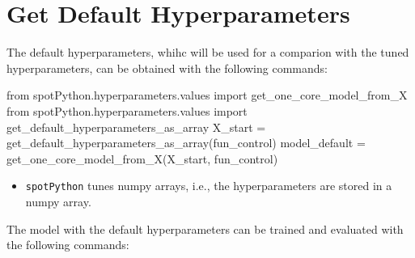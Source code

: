 \documentclass[
  letterpaper,
  DIV=11,
  numbers=noendperiod]{scrreprt}
\newenvironment{Shaded}{\begin{snugshade}}{\end{snugshade}}
\newcommand{\ImportTok}[1]{\textcolor[rgb]{0.00,0.46,0.62}{#1}}
\newcommand{\NormalTok}[1]{\textcolor[rgb]{0.00,0.23,0.31}{#1}}
\newcommand{\OperatorTok}[1]{\textcolor[rgb]{0.37,0.37,0.37}{#1}}
\providecommand{\tightlist}{%
  \setlength{\itemsep}{0pt}\setlength{\parskip}{0pt}}\usepackage{longtable,booktabs,array}
\begin{document}
\section{Get Default
Hyperparameters}\label{get-default-hyperparameters-1}

The default hyperparameters, whihc will be used for a comparion with the
tuned hyperparameters, can be obtained with the following commands:

\begin{Shaded}
\begin{Highlighting}[]
\ImportTok{from}\NormalTok{ spotPython.hyperparameters.values }\ImportTok{import}\NormalTok{ get\_one\_core\_model\_from\_X}
\ImportTok{from}\NormalTok{ spotPython.hyperparameters.values }\ImportTok{import}\NormalTok{ get\_default\_hyperparameters\_as\_array}
\NormalTok{X\_start }\OperatorTok{=}\NormalTok{ get\_default\_hyperparameters\_as\_array(fun\_control)}
\NormalTok{model\_default }\OperatorTok{=}\NormalTok{ get\_one\_core\_model\_from\_X(X\_start, fun\_control)}
\end{Highlighting}
\end{Shaded}

\begin{tcolorbox}[enhanced jigsaw, coltitle=black, bottomrule=.15mm, breakable, toprule=.15mm, colframe=quarto-callout-note-color-frame, title=\textcolor{quarto-callout-note-color}{\faInfo}\hspace{0.5em}{Note: \texttt{spotPython} tunes numpy arrays}, colbacktitle=quarto-callout-note-color!10!white, opacityback=0, left=2mm, leftrule=.75mm, colback=white, rightrule=.15mm, bottomtitle=1mm, toptitle=1mm, titlerule=0mm, arc=.35mm, opacitybacktitle=0.6]

\begin{itemize}
\tightlist
\item
  \texttt{spotPython} tunes numpy arrays, i.e., the hyperparameters are
  stored in a numpy array.
\end{itemize}

\end{tcolorbox}

The model with the default hyperparameters can be trained and evaluated
with the following commands:
\end{document}
